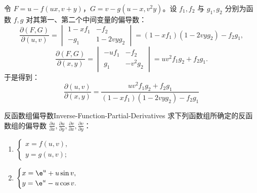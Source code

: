 \begin{solution}

    令 $F = u - f(ux, v + y)$，$G = v - g(u - x, v^2y)$。设 $f_1, f_2$ 与 $g_1, g_2$ 分别为函数 $f, g$ 对其第一、第二个中间变量的偏导数：
    \begin{equation}
        \frac{\partial(F,G)}{\partial(u,v)} =
        \begin{vmatrix}
            1 - xf_1 & -f_2       \\
            -g_1     & 1 - 2vyg_2
        \end{vmatrix} = (1 - xf_1)(1 - 2vyg_2) - f_2g_1,
    \end{equation}
    \begin{equation}
        \frac{\partial(F,G)}{\partial(x,y)} =
        \begin{vmatrix}
            -uf_1 & -f_2    \\
            g_1   & -v^2g_2
        \end{vmatrix} = uv^2f_1g_2 + f_2g_1.
    \end{equation}
    于是得到：
    \begin{equation}
        \boxed{\frac{\partial(u,v)}{\partial(x,y)} = \frac{uv^2f_1g_2 + f_2g_1}{(1 - xf_1)(1 - 2vyg_2) - f_2g_1}}
    \end{equation}
\end{solution}


\begin{problem}{反函数组偏导数}{Inverse-Function-Partial-Derivatives}
    求下列函数组所确定的反函数组的偏导数 $\frac{\partial u}{\partial x}, \frac{\partial u}{\partial y}, \frac{\partial v}{\partial x}, \frac{\partial v}{\partial y}$：
    \begin{enumerate}
        \item $\begin{cases} x = f(u, v), \\ y = g(u, v); \end{cases}$
        \item $\begin{cases} x = \e^u + u \sin v, \\ y = \e^u - u \cos v. \end{cases}$
    \end{enumerate}
\end{problem}

